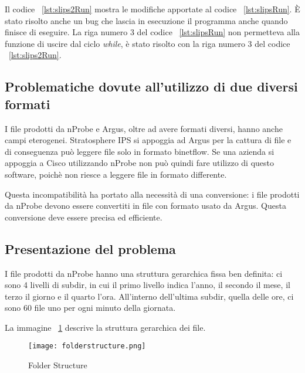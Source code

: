 \documentclass[../main.tex]{subfiles}
\begin{document}


Il codice ~\ref{lst:slips2Run} mostra le modifiche apportate al codice ~\ref{lst:slipsRun}. È stato risolto anche un bug che lascia in esecuzione il programma anche quando finisce di eseguire. La riga numero 3 del codice ~\ref{lst:slipsRun} non permetteva alla funzione di uscire dal ciclo \textit{while}, è stato risolto con la riga numero 3 del codice ~\ref{lst:slips2Run}.



\subsection{Problematiche dovute all'utilizzo di due diversi formati}
I file prodotti da nProbe e Argus, oltre ad avere formati diversi, hanno anche campi eterogenei. Stratosphere IPS si appoggia ad Argus per la cattura di file e di conseguenza può leggere file solo in formato binetflow. 
Se una azienda si appoggia a Cisco utilizzando nProbe non può quindi fare utilizzo di questo software, poichè non riesce a leggere file in formato differente.

Questa incompatibilità ha portato alla necessità di una conversione: i file prodotti da nProbe devono essere convertiti in file con formato usato da Argus. Questa conversione deve essere precisa ed efficiente.

\subsection{Presentazione del problema}
I file prodotti da nProbe hanno una struttura gerarchica fissa ben definita: ci sono 4 livelli di subdir, in cui il primo livello indica l'anno, il secondo il mese, il terzo il giorno e il quarto l'ora. All'interno dell'ultima subdir, quella delle ore, ci sono 60 file uno per ogni minuto della giornata.

La immagine ~\ref{fig:folderStructure} descrive la struttura gerarchica dei file.

\begin{figure}[H]
\centering
\texttt{[image: folderstructure.png]}
\caption{Folder Structure}
				\label{fig:folderStructure}
\end{figure}
\end{document}
